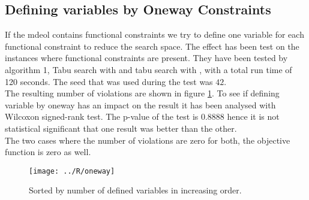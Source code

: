 \subsection{Defining variables by Oneway Constraints}
If the mdeol contains functional constraints we try to define one variable for each functional constraint to reduce the 
search space. The effect has been test on the instances where functional constraints are present. They have been tested 
by algorithm 1, Tabu search with  and tabu search with , with a 
total run time of 120 seconds. The seed that was used during the test was $42$. \\ 
The resulting number of violations are shown in figure \ref{fig_oneway}. To see if defining variable 
by oneway has an impact on the result it has been analysed with Wilcoxon signed-rank test. The p-value of the test is 
0.8888 hence it is not statistical significant that one result was better than the other. \\ 
The two cases where the number of violations are zero for both, the objective function is zero as well. 
\begin{figure}[!h]
\centering
\texttt{[image: ../R/oneway]} \caption{Sorted by number of defined variables in 
increasing order.}\label{fig_oneway}
\end{figure}\noindent
\
